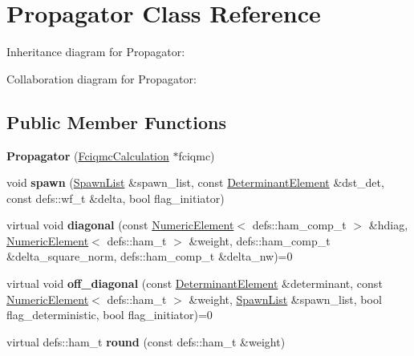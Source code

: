 \hypertarget{classPropagator}{}\section{Propagator Class Reference}
\label{classPropagator}


Inheritance diagram for Propagator\+:


Collaboration diagram for Propagator\+:
\subsection*{Public Member Functions}
\begin{DoxyCompactItemize}
\item 
{\bfseries Propagator} (\hyperlink{classFciqmcCalculation}{Fciqmc\+Calculation} $\ast$fciqmc)\hypertarget{classPropagator_acd1e3b7e54bc7d5355147af9537ef293}{}\label{classPropagator_acd1e3b7e54bc7d5355147af9537ef293}

\item 
void {\bfseries spawn} (\hyperlink{structSpawnList}{Spawn\+List} \&spawn\+\_\+list, const \hyperlink{classDeterminantElement}{Determinant\+Element} \&dst\+\_\+det, const defs\+::wf\+\_\+t \&delta, bool flag\+\_\+initiator)\hypertarget{classPropagator_a108e9965b4c81d2d10eaa803c319ac1c}{}\label{classPropagator_a108e9965b4c81d2d10eaa803c319ac1c}

\item 
virtual void {\bfseries diagonal} (const \hyperlink{classNumericElement}{Numeric\+Element}$<$ defs\+::ham\+\_\+comp\+\_\+t $>$ \&hdiag, \hyperlink{classNumericElement}{Numeric\+Element}$<$ defs\+::ham\+\_\+t $>$ \&weight, defs\+::ham\+\_\+comp\+\_\+t \&delta\+\_\+square\+\_\+norm, defs\+::ham\+\_\+comp\+\_\+t \&delta\+\_\+nw)=0\hypertarget{classPropagator_aa8085bdb4936f6a949a9b67983c59dc8}{}\label{classPropagator_aa8085bdb4936f6a949a9b67983c59dc8}

\item 
virtual void {\bfseries off\+\_\+diagonal} (const \hyperlink{classDeterminantElement}{Determinant\+Element} \&determinant, const \hyperlink{classNumericElement}{Numeric\+Element}$<$ defs\+::ham\+\_\+t $>$ \&weight, \hyperlink{structSpawnList}{Spawn\+List} \&spawn\+\_\+list, bool flag\+\_\+deterministic, bool flag\+\_\+initiator)=0\hypertarget{classPropagator_a810395559ba2da04135c5ad2f0e66f5d}{}\label{classPropagator_a810395559ba2da04135c5ad2f0e66f5d}

\item 
virtual defs\+::ham\+\_\+t {\bfseries round} (const defs\+::ham\+\_\+t \&weight)\hypertarget{classPropagator_ac7ec659c02b60b85d2d85439f727a796}{}\label{classPropagator_ac7ec659c02b60b85d2d85439f727a796}


\end{DoxyCompactItemize}
